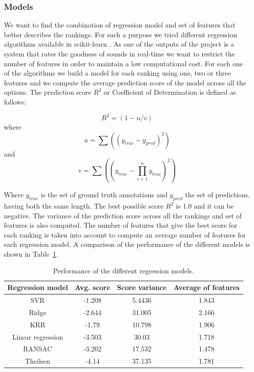 \documentclass{article}
\begin{document}
\subsubsection{Models}
We want to find the combination of regression model and set of features that better describes the rankings. For such a purpose we tried different regression algorithms available in scikit-learn \cite{08}.  As one of the outputs of the project is a system that rates the goodness of sounds in real-time we want to restrict the number of features in order to maintain a low computational cost. For each one of the algorithms we build a model for each ranking using one, two or three features and we compute the average prediction score of the model across all the options. The prediction score $R^2$  or Coefficient of Determination is defined as follows:

\begin{equation}
 R^2 = (1 - u/v) 
\end{equation}
where
\begin{equation}
	u = \sum\nolimits((y_{true} - y_{pred})^2)
\end{equation}
and
\begin{equation}
	v = \sum\nolimits((y_{true} - \prod\limits_{i=1}^n y_{true})^2)
\end{equation}

Where $y_{true}$ is the set of ground truth annotations and $y_{pred}$ the set of predictions, having both the same length. The best possible score $R^2$ is 1.0 and it can be negative.
The variance of the prediction score across all the rankings and set of features is also computed. 
The number of features that give the best score for each ranking is taken into account to compute an average number of features for each regression model. A comparison of the performance of the different models is shown in Table~\ref{models}.

\begin{table}[ht]
\centering
\label{my-label}
\begin{tabular}{cccc}
\hline
Regression model  & Avg. score & Score variance & Average of features \\ \hline
SVR               & -1.208     & 5.4436         & 1.843               \\
Ridge             & -2.644     & 31.005         & 2.166               \\
KRR               & -1.79      & 10.798         & 1.906               \\
Linear regression & -3.503     & 30.03          & 1.718               \\
RANSAC            & -3.202     & 17.532         & 1.478               \\
Theilsen          & -4.14      & 37.135         & 1.781               \\ \hline
\end{tabular}
\caption{Performance of the different regression models.}
\label{models}
\end{table}
\end{document}
